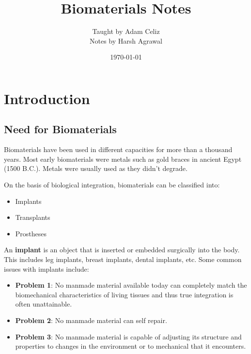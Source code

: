 \documentclass[12pt]{article}
\title{\Huge\centering Biomaterials Notes}
\author{Taught by Adam Celiz \\ Notes by Harsh Agrawal}
\date{\today}
\begin{document}
\maketitle
\tableofcontents
\newpage

\section{Introduction}
\subsection{Need for Biomaterials}
Biomaterials have been used in different capacities for more than a thousand
years. Most early biomaterials were metals such as gold braces in ancient Egypt
(1500 B.C.). Metals were usually used as they didn't degrade.

On the basis of biological integration, biomaterials can be classified into:
\begin{itemize}
    \item Implants
    \item Transplants
    \item Prostheses
\end{itemize}

An \textbf{implant} is an object that is inserted or embedded surgically into
the body. This includes leg implants, breast implants, dental implants, etc.
Some common issues with implants include:
\begin{itemize}
    \item \textbf{Problem 1}: No manmade material available today can completely match the biomechanical characteristics of living tissues and thus true integration is often unattainable.
    \item \textbf{Problem 2}: No manmade material can self repair.
    \item \textbf{Problem 3}: No manmade material is capable of adjusting its
          structure and properties to changes in the environment or to mechanical
          that it encounters.
\end{itemize}
\end{document}
